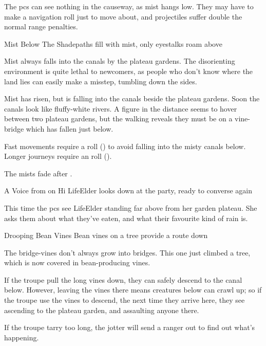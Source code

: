 The \glspl{pc} can see nothing in the causeway, as mist hangs low.
They may have to make a navigation roll just to move about, and projectiles suffer double the normal range penalties.


{Mist Below}%
{The Shadepaths fill with mist, only eyestalks roam above}%

Mist always falls into the canals by the plateau gardens.
The disorienting environment is quite lethal to newcomers, as people who don't know where the land lies can easily make a misstep, tumbling down the sides.

\begin{boxtext}
  Mist has risen, but is falling into the canals beside the plateau gardens.
  Soon the canals look like fluffy-white rivers.
  A figure in the distance seems to hover between two plateau gardens, but the walking reveals they must be on a vine-bridge which has fallen just below.
\end{boxtext}

Fast movements require a  roll (\tn[8]) to avoid falling into the misty canals below.
Longer journeys require an  roll (\tn[10]).

The mists fade after .

{A Voice from on Hi}%
{LifeElder looks down at the party, ready to converse again}%

This time the \glspl{pc} see \gls{LifeElder} standing far above from her garden plateau.
She asks them about what they've eaten, and what their favourite kind of rain is.

{Drooping Bean Vines}%
{Bean vines on a tree provide a route down}%

The bridge-vines don't always grow into bridges.
This one just climbed a tree, which is now covered in bean-producing vines.

If the troupe pull the long vines down, they can safely descend to the canal below.
However, leaving the vines there means creatures below can crawl up; so if the troupe use the vines to descend, the next time they arrive here, they see  ascending to the plateau garden, and assaulting anyone there.


If the troupe tarry too long, the \gls{jotter} will send a ranger out to find out what's happening.

